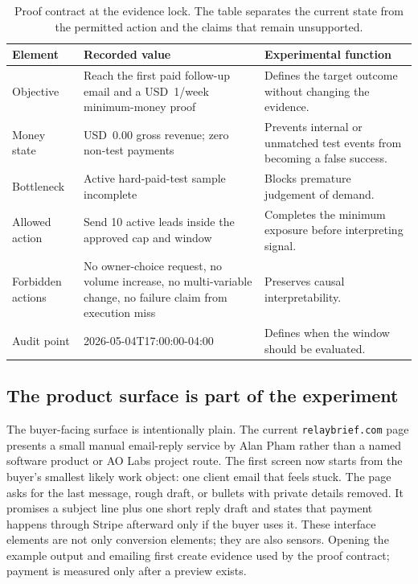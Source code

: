 \documentclass[12pt,letterpaper]{article}
\begin{document}
\begin{table}[tbp]
\centering
\small
\caption{Proof contract at the evidence lock. The table separates the current state from the permitted action and the claims that remain unsupported.}
\label{tab:proof_contract}
\begin{tabularx}{\textwidth}{L{0.22\textwidth}Y Y}
\toprule
{}
\textbf{Element} & \textbf{Recorded value} & \textbf{Experimental function} \\
\midrule
Objective & Reach the first paid follow-up email and a USD~1/week minimum-money proof & Defines the target outcome without changing the evidence. \\
Money state & USD~0.00 gross revenue; zero non-test payments & Prevents internal or unmatched test events from becoming a false success. \\
Bottleneck & Active hard-paid-test sample incomplete & Blocks premature judgement of demand. \\
Allowed action & Send 10 active leads inside the approved cap and window & Completes the minimum exposure before interpreting signal. \\
Forbidden actions & No owner-choice request, no volume increase, no multi-variable change, no failure claim from execution miss & Preserves causal interpretability. \\
Audit point & 2026-05-04T17:00:00-04:00 & Defines when the window should be evaluated. \\
\bottomrule
\end{tabularx}
\end{table}

\subsection{The product surface is part of the experiment}

The buyer-facing surface is intentionally plain. The current \texttt{relaybrief.com} page presents a small manual email-reply service by Alan Pham rather than a named software product or AO Labs project route. The first screen now starts from the buyer's smallest likely work object: one client email that feels stuck. The page asks for the last message, rough draft, or bullets with private details removed. It promises a subject line plus one short reply draft and states that payment happens through Stripe afterward only if the buyer uses it. These interface elements are not only conversion elements; they are also sensors. Opening the example output and emailing first create evidence used by the proof contract; payment is measured only after a preview exists.
\end{document}
